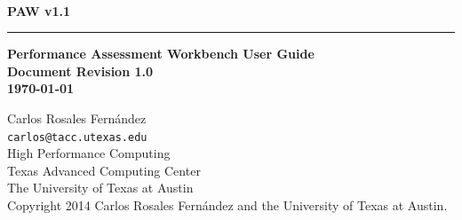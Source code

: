 \documentclass[10pt,a4paper]{report}
\begin{document}
\begin{titlepage}
\thispagestyle{empty}	%
\verb+ +
\vspace{1em}
\begin{flushright}
\huge\bf PAW v1.1\\
\rule{\textwidth}{4pt}
\large{\bf Performance Assessment Workbench User Guide\\
Document Revision 1.0\\
\today}
\end{flushright}

\newpage
\thispagestyle{empty}
\begin{flushleft}
Carlos Rosales Fern\'andez\\
\verb+carlos@tacc.utexas.edu+\\
\vspace{0.5em}
High Performance Computing \\
Texas Advanced Computing Center\\
The University of Texas at Austin\\
\vspace{1cm}
Copyright 2014 Carlos Rosales Fern\'andez and the University of Texas at Austin.
\end{flushleft}
\newpage
\end{titlepage}
\end{document}
